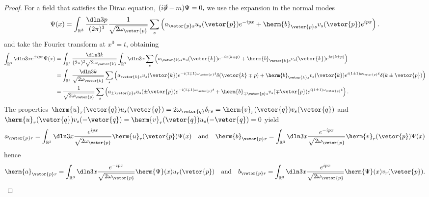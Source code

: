 \begin{proof}
   For a field that satisfies the Dirac equation, \((i \slashed{\partial} - m)\Psi = 0,\) we use the expansion in the normal modes
   \begin{equation*}
      \Psi(x) = \int_{\mathbb{R}^3} \frac{\dln3p}{(2\pi)^3} \frac{1}{\sqrt{2 \omega_{\vetor{p}}}} \sum_s \left(a_{\vetor{p}s} u_{s}(\vetor{p}) e^{-ipx} + \herm{b}_{\vetor{p}s}v_{s}(\vetor{p}) e^{ipx}\right).
   \end{equation*}
   and take the Fourier transform at \(x^0 = t\), obtaining
   \begin{align*}
      \int_{\mathbb{R}^3}\dln3x e^{\pm ipx} \Psi(x) &= \int_{\mathbb{R}^3} \frac{\dln3k}{(2\pi)^3 \sqrt{2\omega_{\vetor{k}}}} \int_{\mathbb{R}^3} \dln3x \sum_{s} \left(a_{\vetor{k}s} u_s(\vetor{k}) e^{- i x(k \mp p)} + \herm{b}_{\vetor{k}s} v_s(\vetor{k}) e^{ix(k \pm p)}\right)\\
                                                    &= \int_{\mathbb{R}^3} \frac{\dln3k}{\sqrt{2 \omega_{\vetor{k}}}} \sum_s \left(a_{\vetor{k} s} u_s(\vetor{k})e^{-i(1 \mp 1)\omega_{\vetor{p}} t} \delta(\vetor{k} \mp p) + \herm{b}_{\vetor{k}s} v_{s}(\vetor{k}) e^{i(1 \pm 1)\omega_{\vetor{p}} t}\delta(k \pm \vetor{p})\right)\\
                                                    &= \frac{1}{\sqrt{2 \omega_{\vetor{p}}}} \sum_s \left(a_{\pm \vetor{p} s} u_s(\pm \vetor{p}) e^{-i(1 \mp 1) \omega_{\vetor{p}} t} + \herm{b}_{\mp \vetor{p}s} v_{s}(\mp \vetor{p}) e^{i(1 \pm 1) \omega_{\vetor{p}} t}\right).
   \end{align*}
   The properties \(\herm{u}_r(\vetor{q}) u_s(\vetor{q}) = 2 \omega_{\vetor{q}} \delta_{rs} = \herm{v}_r(\vetor{q}) v_s(\vetor{q})\) and \(\herm{u}_r(\vetor{q})v_s(-\vetor{q}) = \herm{v}_r(\vetor{q}) u_s(-\vetor{q}) = 0\) yield
   \begin{equation*}
      a_{\vetor{p}r} = \int_{\mathbb{R}^3} \dln3x \frac{e^{ipx}}{\sqrt{2 \omega_{\vetor{p}}}} \herm{u}_{r}(\vetor{p}) \Psi(x)
      \quad\text{and}\quad
      \herm{b}_{\vetor{p}r} = \int_{\mathbb{R}^3} \dln3x \frac{e^{-ipx}}{\sqrt{2 \omega_{\vetor{p}}}} \herm{v}_r(\vetor{p})\Psi(x)
   \end{equation*}
   hence
   \begin{equation*}
      \herm{a}_{\vetor{p}r} = \int_{\mathbb{R}^3} \dln3x \frac{e^{-ipx}}{\sqrt{2 \omega_{\vetor{p}}}} \herm{\Psi}(x)u_{r}(\vetor{p}) 
      \quad\text{and}\quad
      b_{\vetor{p}r} = \int_{\mathbb{R}^3} \dln3x \frac{e^{ipx}}{\sqrt{2 \omega_{\vetor{p}}}} \herm{\Psi}(x)v_r(\vetor{p}).
   \end{equation*}

\end{proof}
